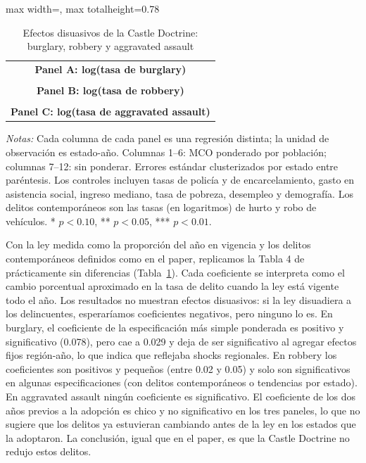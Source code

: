 \documentclass[11pt,a4paper]{article}
\newcommand{\notas}[1]{\par\vspace{0.3em}\begin{minipage}{0.92\linewidth}\footnotesize\textit{Notas:} #1\end{minipage}}
\begin{document}
\begin{landscape}
\begin{table}[H]\centering
\caption{Efectos disuasivos de la Castle Doctrine: burglary, robbery y aggravated assault}\label{tab:t4}
\scriptsize
\begin{adjustbox}{max width=\linewidth, max totalheight=0.78\textheight}
\begin{tabular}{c}
\textbf{Panel A: log(tasa de burglary)}\\
\\[0.5em]
\textbf{Panel B: log(tasa de robbery)}\\
\\[0.5em]
\textbf{Panel C: log(tasa de aggravated assault)}\\

\end{tabular}
\end{adjustbox}
\notas{Cada columna de cada panel es una regresión distinta; la unidad de observación es estado-año. Columnas 1--6: MCO ponderado por población; columnas 7--12: sin ponderar. Errores estándar clusterizados por estado entre paréntesis. Los controles incluyen tasas de policía y de encarcelamiento, gasto en asistencia social, ingreso mediano, tasa de pobreza, desempleo y demografía. Los delitos contemporáneos son las tasas (en logaritmos) de hurto y robo de vehículos. * $p<0.10$, ** $p<0.05$, *** $p<0.01$.}
\end{table}
\end{landscape}

Con la ley medida como la proporción del año en vigencia y los delitos contemporáneos definidos como en el paper, replicamos la Tabla 4 de \citet{cheng} prácticamente sin diferencias (Tabla~\ref{tab:t4}). Cada coeficiente se interpreta como el cambio porcentual aproximado en la tasa de delito cuando la ley está vigente todo el año. Los resultados no muestran efectos disuasivos: si la ley disuadiera a los delincuentes, esperaríamos coeficientes negativos, pero ninguno lo es. En burglary, el coeficiente de la especificación más simple ponderada es positivo y significativo (0.078), pero cae a 0.029 y deja de ser significativo al agregar efectos fijos región-año, lo que indica que reflejaba shocks regionales. En robbery los coeficientes son positivos y pequeños (entre 0.02 y 0.05) y solo son significativos en algunas especificaciones (con delitos contemporáneos o tendencias por estado). En aggravated assault ningún coeficiente es significativo. El coeficiente de los dos años previos a la adopción es chico y no significativo en los tres paneles, lo que no sugiere que los delitos ya estuvieran cambiando antes de la ley en los estados que la adoptaron. La conclusión, igual que en el paper, es que la Castle Doctrine no redujo estos delitos.
\end{document}
